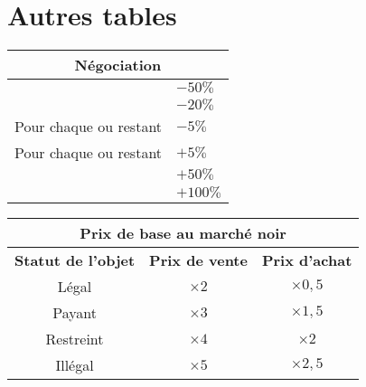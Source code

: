 \documentclass{article}
\newcommand{\diceadvantage}{\hspace{0.1cm}{\Large \texttt{[image: ../img/result\_avantage\_advantage]}}\hspace{0.1cm}}
\newcommand{\dicedespair}{\hspace{0.1cm}{\Large \texttt{[image: ../img/result\_desastre\_despair]}}\hspace{0.1cm}}
\newcommand{\dicefailure}{\hspace{0.1cm}{\Large \texttt{[image: ../img/result\_echec\_failure]}}\hspace{0.1cm}}
\newcommand{\dicethreat}{\hspace{0.1cm}{\Large \texttt{[image: ../img/result\_menace\_threat]}}\hspace{0.1cm}}
\newcommand{\dicesuccess}{\hspace{0.1cm}{\Large \texttt{[image: ../img/result\_succes\_success]}}\hspace{0.1cm}}
\newcommand{\dicetriumph}{\hspace{0.1cm}{\Large \texttt{[image: ../img/result\_triomphe\_triumph]}}\hspace{0.1cm}}
\begin{document}
\section*{Autres tables}
\begin{multicols}{2}
	\begin{tabular}[b]{|p{5cm}|p{1.5cm}|}
		\hline 
		\multicolumn{2}{|c|}{\cellcolor{DarkRed} \textbf{{\large \textcolor{PureWhite}{Négociation}}}} \\ 
		\hline 
		\dicetriumph \dicetriumph & $-50\%$ \\ 
		\hline 
		\dicetriumph & $-20\%$ \\ 
		\hline 
		Pour chaque \dicesuccess ou \diceadvantage restant & $-5\%$ \\ 
		\hline 
		Pour chaque \dicefailure ou \dicethreat restant & $+5\%$ \\  
		\hline 
		\dicedespair & $+50\%$ \\ 
		\hline 
		\dicedespair \dicedespair & $+100\%$ \\ 
		\hline 
	\end{tabular} 
	\begin{tabular}{|c|c|c|}
		\hline 
		\multicolumn{3}{|c|}{\cellcolor{DarkRed} \textbf{{\large \textcolor{PureWhite}{Prix de base au marché noir}}}} \\ 
		\hline 
		\cellcolor{DarkGold}\textbf{Statut de l'objet} & \cellcolor{DarkGold}\textbf{Prix de vente} & \cellcolor{DarkGold}\textbf{Prix d'achat} \\ 
		\hline 
		Légal & $\times2$ & $\times0,5$ \\ 
		\hline 
		Payant & $\times3$ & $\times1,5$ \\ 
		\hline 
		Restreint & $\times4$ & $\times2$ \\ 
		\hline 
		Illégal & $\times5$ & $\times2,5$ \\ 
		\hline 
	\end{tabular}
\end{multicols}
\end{document}
